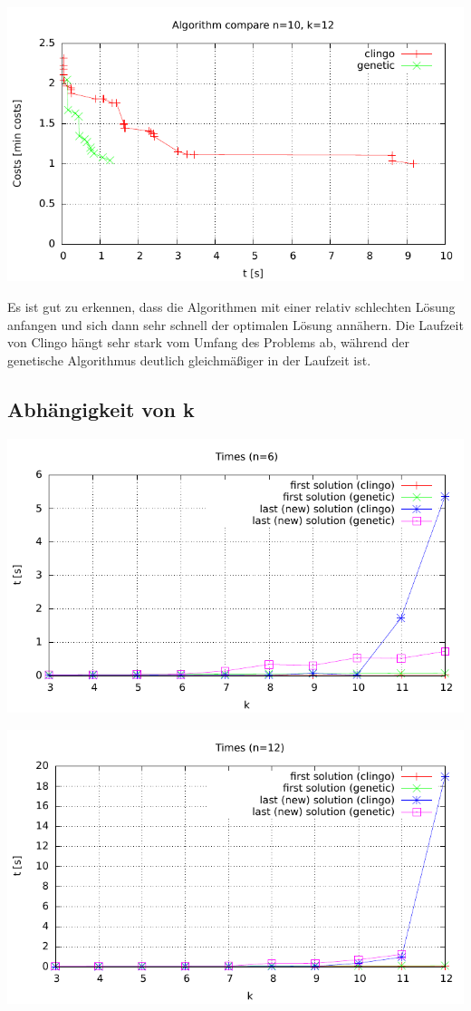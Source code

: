 \includegraphics{../../plots/algorithmCompare-n10-k12.pdf}


Es ist gut zu erkennen, dass die Algorithmen mit einer relativ schlechten Lösung anfangen und sich dann sehr schnell der optimalen Lösung annähern. Die Laufzeit von Clingo hängt sehr stark vom Umfang des Problems ab, während der genetische Algorithmus deutlich gleichmäßiger in der Laufzeit ist.


\subsection{Abhängigkeit von k}

\includegraphics{../../plots/timesPerK-n6.pdf}

\includegraphics{../../plots/timesPerK-n12.pdf}


